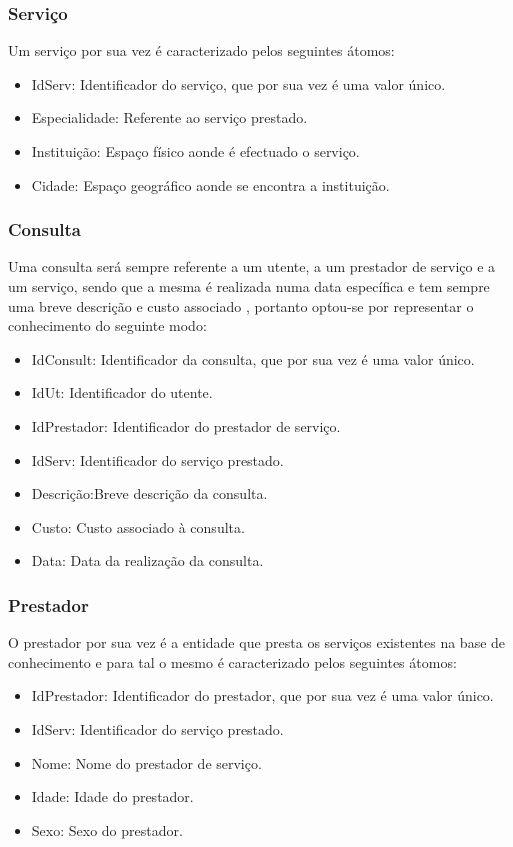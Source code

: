 \documentclass[25pt]{article}
\begin{document}
\subsubsection{Serviço}
Um serviço por sua vez é  caracterizado pelos seguintes átomos:
\begin{itemize}
  \item IdServ: Identificador do serviço, que por sua vez é uma valor único.
  \item Especialidade: Referente ao serviço prestado.
  \item Instituição: Espaço físico aonde é efectuado o serviço.
  \item Cidade: Espaço geográfico aonde se encontra a instituição.
\end{itemize}

\subsubsection{Consulta}
Uma consulta será sempre referente a um utente, a um prestador de serviço e a um serviço, sendo que a mesma é realizada numa data específica e tem sempre uma breve descrição e custo associado , portanto optou-se por representar o conhecimento do seguinte modo:

\begin{itemize}
  \item IdConsult: Identificador da consulta, que por sua vez é uma valor único.
  \item IdUt: Identificador do utente.
  \item IdPrestador: Identificador do prestador de serviço.
  \item IdServ: Identificador do serviço prestado.
  \item Descrição:Breve descrição da consulta.
  \item Custo: Custo associado à consulta.
  \item Data: Data da realização da consulta.
\end{itemize}

\subsubsection{Prestador}
O prestador por sua vez é a entidade que presta os serviços existentes na base de conhecimento e para tal o mesmo é caracterizado pelos seguintes
átomos:

\begin{itemize}
  \item IdPrestador: Identificador do prestador, que por sua vez é uma valor único.
  \item IdServ: Identificador do serviço prestado.
  \item Nome:   Nome do prestador de serviço.
  \item Idade:  Idade do prestador.
  \item Sexo:   Sexo do prestador.
 \end{itemize}
\end{document}
